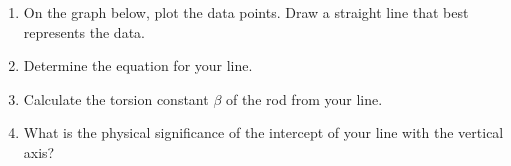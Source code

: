 \documentclass{../../../oss-classkick}
\begin{document}
\begin{enumerate}
  \begin{enumerate}[resume]
  \item On the graph below, plot the data points. Draw a straight line that
    best represents the data.
 
  \item Determine the equation for your line.
 
  \item Calculate the torsion constant $\beta$ of the rod from your line.
 
  \item What is the physical significance of the intercept of your line with
    the vertical axis?
  \end{enumerate}
\end{enumerate}
\end{document}

